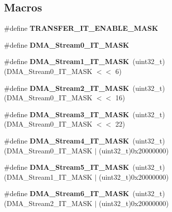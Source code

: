 \subsection*{Macros}
\begin{DoxyCompactItemize}
\item 
\#define {\bfseries T\+R\+A\+N\+S\+F\+E\+R\+\_\+\+I\+T\+\_\+\+E\+N\+A\+B\+L\+E\+\_\+\+M\+A\+SK}
\item 
\#define {\bfseries D\+M\+A\+\_\+\+Stream0\+\_\+\+I\+T\+\_\+\+M\+A\+SK}
\item 
\mbox{\label{group___d_m_a_ga145798f7c0cffc0effe3b6588f7a5812}} 
\#define {\bfseries D\+M\+A\+\_\+\+Stream1\+\_\+\+I\+T\+\_\+\+M\+A\+SK}~(uint32\+\_\+t)(D\+M\+A\+\_\+\+Stream0\+\_\+\+I\+T\+\_\+\+M\+A\+SK $<$$<$ 6)
\item 
\mbox{\label{group___d_m_a_gab7e71eaed70613ad592acfb37eb37777}} 
\#define {\bfseries D\+M\+A\+\_\+\+Stream2\+\_\+\+I\+T\+\_\+\+M\+A\+SK}~(uint32\+\_\+t)(D\+M\+A\+\_\+\+Stream0\+\_\+\+I\+T\+\_\+\+M\+A\+SK $<$$<$ 16)
\item 
\mbox{\label{group___d_m_a_ga83a5c838038ce61242f8beaf8d9fff43}} 
\#define {\bfseries D\+M\+A\+\_\+\+Stream3\+\_\+\+I\+T\+\_\+\+M\+A\+SK}~(uint32\+\_\+t)(D\+M\+A\+\_\+\+Stream0\+\_\+\+I\+T\+\_\+\+M\+A\+SK $<$$<$ 22)
\item 
\mbox{\label{group___d_m_a_ga55d28ead27e0af7d17db2b749695abe2}} 
\#define {\bfseries D\+M\+A\+\_\+\+Stream4\+\_\+\+I\+T\+\_\+\+M\+A\+SK}~(uint32\+\_\+t)(D\+M\+A\+\_\+\+Stream0\+\_\+\+I\+T\+\_\+\+M\+A\+SK $\vert$ (uint32\+\_\+t)0x20000000)
\item 
\mbox{\label{group___d_m_a_gaceb30b7dcde1275d843ea932a00f44d7}} 
\#define {\bfseries D\+M\+A\+\_\+\+Stream5\+\_\+\+I\+T\+\_\+\+M\+A\+SK}~(uint32\+\_\+t)(D\+M\+A\+\_\+\+Stream1\+\_\+\+I\+T\+\_\+\+M\+A\+SK $\vert$ (uint32\+\_\+t)0x20000000)
\item 
\mbox{\label{group___d_m_a_ga085aa754247e62f4b95111ea4ebf4f6f}} 
\#define {\bfseries D\+M\+A\+\_\+\+Stream6\+\_\+\+I\+T\+\_\+\+M\+A\+SK}~(uint32\+\_\+t)(D\+M\+A\+\_\+\+Stream2\+\_\+\+I\+T\+\_\+\+M\+A\+SK $\vert$ (uint32\+\_\+t)0x20000000)
\item 
\mbox{\label{group___d_m_a_ga1fe8cb133c442e62bd082adee93a890e}} 
$$
\end{DoxyCompactItemize}
